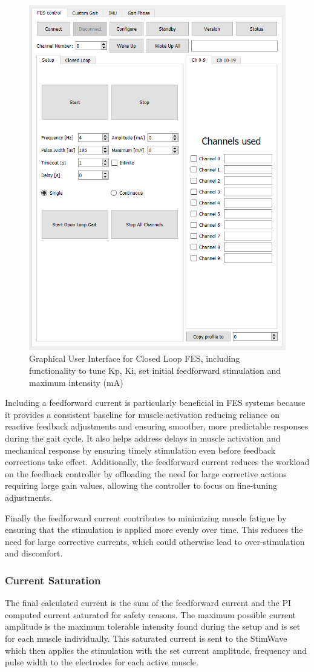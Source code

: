 \begin{figure}
    \centering
    \includegraphics[width=0.65\linewidth]{images/clgui.png}
    \caption{Graphical User Interface for Closed Loop FES, including functionality to tune Kp, Ki, set initial feedforward stimulation and maximum intensity (mA)}
    \label{fig:clsetup}
\end{figure}

Including a feedforward current is particularly beneficial in FES systems because it provides a consistent baseline for muscle activation reducing reliance on reactive feedback adjustments and ensuring smoother, more predictable responses during the gait cycle. It also helps address delays in muscle activation and mechanical response by ensuring timely stimulation even before feedback corrections take effect. Additionally, the feedforward current reduces the workload on the feedback controller by offloading the need for large corrective actions requiring large gain values, allowing the controller to focus on fine-tuning adjustments.

Finally the feedforward current contributes to minimizing muscle fatigue by ensuring that the stimulation is applied more evenly over time. This reduces the need for large corrective currents, which could otherwise lead to over-stimulation and discomfort.

\subsubsection{Current Saturation}
The final calculated current is the sum of the feedforward current and the PI computed current saturated for safety reasons. The maximum possible current amplitude is the maximum tolerable intensity found during the setup and is set for each muscle individually. This saturated current is sent to the StimWave which then applies the stimulation with the set current amplitude, frequency and pulse width to the electrodes for each active muscle.

